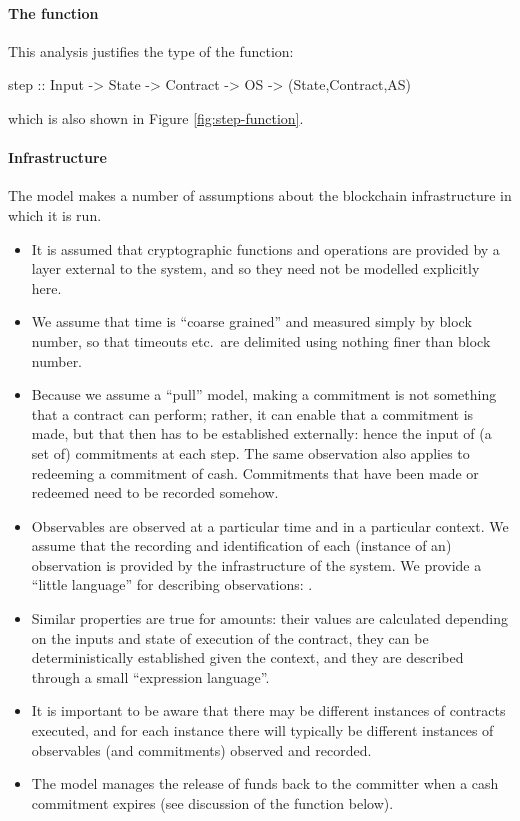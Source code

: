 \documentclass[
      acmsmall
    , screen
    , review=true
  ]{acmart}
\begin{document}
\paragraph{The  function}


This analysis justifies the type of the  function:

\begin{haskellcode}
step :: Input -> State -> Contract -> OS -> (State,Contract,AS)
\end{haskellcode}

which is also shown in Figure \ref{fig:step-function}.

\paragraph{Infrastructure}

The model makes a number of assumptions about the blockchain infrastructure in which it is run.

\begin{itemize}
\item It is assumed that cryptographic functions and operations are provided by a layer external to the system, and so they need not be modelled explicitly here.
\item We assume that time is ``coarse grained'' and measured simply by block number, so that timeouts etc.\ are delimited using nothing finer than block number. 
\item Because we assume a ``pull'' model, making a commitment is not something that a contract can perform; rather, it can enable that a commitment is made, but that then has to be established externally: hence the input of (a set of) commitments at each step. The same observation also applies to redeeming a commitment of cash. Commitments that have been made or redeemed need to be recorded somehow.

\item Observables are observed at a particular time and in a particular context. We assume that the recording and 
identification of each (instance of an) observation is provided by the infrastructure of the system. We provide a 
``little language'' for describing observations: . 
\item
Similar properties are true for
 amounts: their values are calculated depending on the inputs and state of execution of the 
contract, they can be deterministically established given the context, and they are described through a small 
``expression language''.
\item It is important to be aware that there may be different instances of contracts executed, and for each instance there will typically be different instances of observables (and commitments) observed and recorded.
\item The model manages the release of funds back to the committer when a cash commitment expires (see discussion of the  function below).
\end{itemize}
\end{document}
